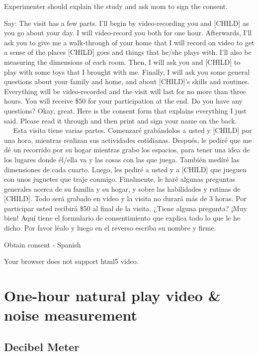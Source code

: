 \documentclass[
  12pt,
]{book}
\begin{document}
Experimenter should explain the study and ask mom to sign the consent.

Say: The visit has a few parts. I'll begin by video-recording you and {[}CHILD{]} as you go about your day. I will video-record you both for one hour. Afterwards, I'll ask you to give me a walk-through of your home that I will record on video to get a sense of the places {[}CHILD{]} goes and things that he/she plays with. I'll also be measuring the dimensions of each room. Then, I will ask you and {[}CHILD{]} to play with some toys that I brought with me. Finally, I will ask you some general questions about your family and home, and about {[}CHILD{]}'s skills and routines. Everything will be video-recorded and the visit will last for no more than three hours. You will receive \$50 for your participation at the end. Do you have any questions? Okay, great. Here is the consent form that explains everything I just said. Please read it through and then print and sign your name on the back.
    Esta visita tiene varias partes. Comenzaré grabándolos a usted y {[}CHILD{]} por una hora, mientras realizan sus actividades cotidianas. Después, le pediré que me dé un recorrido por su hogar mientras grabo los espacios, para tener una idea de los lugares donde él/ella va y las cosas con las que juega. También mediré las dimensiones de cada cuarto. Luego, les pediré a usted y a {[}CHILD{]} que jueguen con unos juguetes que traje conmigo. Finalmente, le haré algunas preguntas generales acerca de su familia y su hogar, y sobre las habilidades y rutinas de {[}CHILD{]}. Todo será grabado en video y la visita no durará más de 3 horas. Por participar usted recibirá \$50 al final de la visita. ¿Tiene alguna pregunta? ¡Muy bien! Aquí tiene el formulario de consentimiento que explica todo lo que le he dicho. Por favor léalo y luego en el reverso escriba su nombre y firme.

Obtain consent - Spanish

Your browser does not support html5 video.

\hypertarget{one-hour-natural-play-video-noise-measurement}{%
\section{One-hour natural play video \& noise measurement}\label{one-hour-natural-play-video-noise-measurement}}

\hypertarget{decibel-meter}{%
\subsection{Decibel Meter}\label{decibel-meter}}
\end{document}
